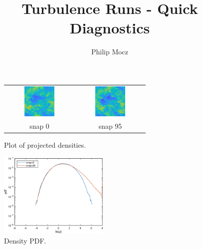 \documentclass{article}
\title{Turbulence Runs - Quick Diagnostics}
\author{Philip Mocz}
\begin{document}
\maketitle


\begin{figure}[ht]
\centering
\begin{tabular}{cc}
\includegraphics[width=0.47\textwidth]{snap0.png}  & 
\includegraphics[width=0.47\textwidth]{snap95.png}  \\
snap 0 & snap 95
\end{tabular}
\caption{Plot of projected densities.}
\end{figure}


\begin{figure}[ht]
\centering
\includegraphics[width=0.47\textwidth]{densitypdf.eps} 
\caption{Density PDF.}
\end{figure}
\end{document}

